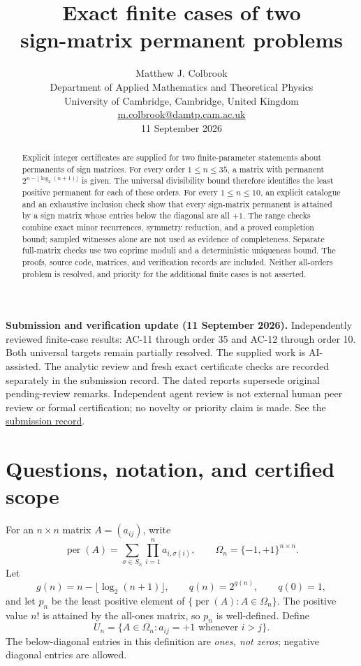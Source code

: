 \documentclass[11pt,a4paper]{article}
\title{Exact finite cases of two\\sign-matrix permanent problems}
\author{{\large Matthew J. Colbrook}\\[3pt]{\small Department of Applied Mathematics and Theoretical Physics}\\{\small University of Cambridge, Cambridge, United Kingdom}\\{\small\href{mailto:m.colbrook@damtp.cam.ac.uk}{m.colbrook@damtp.cam.ac.uk}}\\[5pt]{\small 11 September 2026}}
\date{}
\theoremstyle{remark}\newtheorem{remark}[theorem]{Remark}
\DeclareMathOperator{\per}{per}
\newcommand{\Om}{\Omega}
\newcommand{\MaxMinOrder}{35}
\newcommand{\MaxRangeOrder}{10}
\begin{document}
\maketitle
\noindent\textbf{Submission and verification update (11 September 2026).} Independently reviewed finite-case results: AC-11 through order 35 and AC-12 through order 10. Both universal targets remain partially resolved. The supplied work is AI-assisted. The analytic review and fresh exact certificate checks are recorded separately in the submission record. The dated reports supersede original pending-review remarks. Independent agent review is not external human peer review or formal certification; no novelty or priority claim is made. See the \href{https://github.com/MColbrook/OpenProblemsInNLA/tree/codex/colbrook-arithmetic-submissions/references/colbrook-arithmetic-2026-09-11}{submission record}.
\par\medskip

\vspace{-2em}
\begin{abstract}
Explicit integer certificates are supplied for two finite-parameter statements about permanents of sign matrices. For every order $1\leq n\leq\MaxMinOrder$, a matrix with permanent $2^{n-\lfloor\log_2(n+1)\rfloor}$ is given. The universal divisibility bound therefore identifies the least positive permanent for each of these orders. For every $1\leq n\leq\MaxRangeOrder$, an explicit catalogue and an exhaustive inclusion check show that every sign-matrix permanent is attained by a sign matrix whose entries below the diagonal are all $+1$. The range checks combine exact minor recurrences, symmetry reduction, and a proved completion bound; sampled witnesses alone are not used as evidence of completeness. Separate full-matrix checks use two coprime moduli and a deterministic uniqueness bound. The proofs, source code, matrices, and verification records are included. Neither all-orders problem is resolved, and priority for the additional finite cases is not asserted.
\end{abstract}

\section{Questions, notation, and certified scope}
For an $n\times n$ matrix $A=(a_{ij})$, write
\[
 \per(A)=\sum_{\sigma\in S_n}\prod_{i=1}^n a_{i,\sigma(i)},\qquad
 \Om_n=\{-1,+1\}^{n\times n}.
\]
Let
\[
 g(n)=n-\lfloor\log_2(n+1)\rfloor,\qquad q(n)=2^{g(n)},\qquad q(0)=1,
\]
and let $p_n$ be the least positive element of $\{\per(A):A\in\Om_n\}$. The positive value $n!$ is attained by the all-ones matrix, so $p_n$ is well-defined. Define
\[
 U_n=\{A\in\Om_n:a_{ij}=+1\text{ whenever }i>j\}.
\]
The below-diagonal entries in this definition are \emph{ones, not zeros}; negative diagonal entries are allowed.
\end{document}
